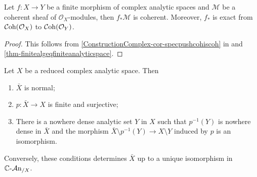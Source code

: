\begin{corollary}\label{cor-finitepushcoh}
    Let $f:X\rightarrow Y$ be a finite morphism of complex analytic spaces and $\mathcal{M}$ be a coherent sheaf of $\mathcal{O}_X$-modules, then $f_*\mathcal{M}$ is coherent. Moreover, $f_*$ is exact from $\mathcal{C}\mathrm{oh}(\mathcal{O}_X)$ to
    $\mathcal{C}\mathrm{oh}(\mathcal{O}_Y)$.
\end{corollary}
\begin{proof}
    This follows from \cref{ConstructionComplex-cor-specpushcohiscoh} in  and \cref{thm-finitealgeqfiniteanalyticspace}.
\end{proof}

\begin{corollary}
    Let $X$ be a reduced complex analytic space. Then 
    \begin{enumerate}
        \item $\bar{X}$ is normal;
        \item $p:\bar{X}\rightarrow X$ is finite and surjective;
        \item There is a nowhere dense analytic set $Y$ in $X$ such that $p^{-1}(Y)$ is nowhere dense in $\bar{X}$ and the morphism $\bar{X}\setminus p^{-1}(Y)\rightarrow X\setminus Y$ induced by $p$ is an isomorphism.
    \end{enumerate}
    Conversely, these conditions determines $\bar{X}$ up to a unique isomorphism in $\mathbb{C}\text{-}\mathcal{A}\mathrm{n}_{/X}$.
\end{corollary}
